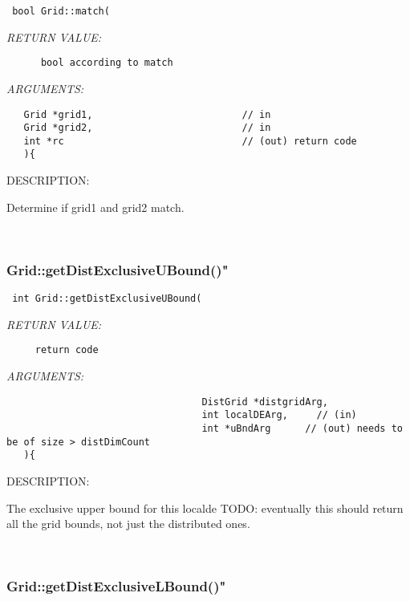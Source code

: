  
\begin{verbatim} bool Grid::match(\end{verbatim}{\em RETURN VALUE:}
\begin{verbatim}      bool according to match\end{verbatim}{\em ARGUMENTS:}
\begin{verbatim}   Grid *grid1,                          // in
   Grid *grid2,                          // in
   int *rc                               // (out) return code
   ){\end{verbatim}
{\sf DESCRIPTION:\\ }


      Determine if grid1 and grid2 match.
   
 
\mbox{}\hrulefill\
 
\subsubsection [Grid::getDistExclusiveUBound()"] {Grid::getDistExclusiveUBound()"}


  
\begin{verbatim} int Grid::getDistExclusiveUBound(\end{verbatim}{\em RETURN VALUE:}
\begin{verbatim}     return code\end{verbatim}{\em ARGUMENTS:}
\begin{verbatim}                                  DistGrid *distgridArg, 
                                  int localDEArg,     // (in)
                                  int *uBndArg      // (out) needs to be of size > distDimCount
   ){\end{verbatim}
{\sf DESCRIPTION:\\ }


    The exclusive upper bound for this localde
   TODO: eventually this should return all the grid bounds, not just
         the distributed ones.
   
 
\mbox{}\hrulefill\
 
\subsubsection [Grid::getDistExclusiveLBound()"] {Grid::getDistExclusiveLBound()"}


